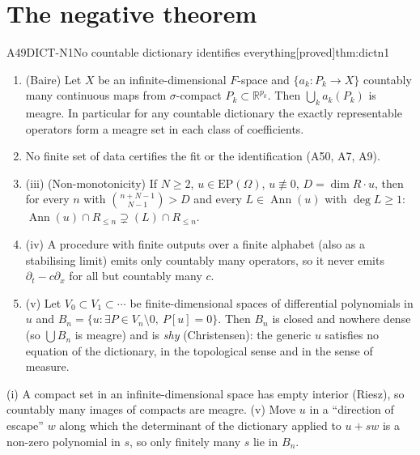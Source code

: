 \documentclass[11pt,a4paper,oneside]{report}
\newcommand{\badge}[2]{\textcolor{#1}{\textsf{\footnotesize[#2]}}}
\newcommand{\proved}{\badge{cC}{proved}}
\newcommand{\R}{\mathbb{R}}\newcommand{\C}{\mathbb{C}}\newcommand{\N}{\mathbb{N}}\newcommand{\Z}{\mathbb{Z}}\newcommand{\Q}{\mathbb{Q}}
\newcommand{\Ann}{\operatorname{Ann}}
\newcommand{\EP}{\mathrm{EP}}
\newenvironment{dimcard}[5]{\par\Needspace{12\baselineskip}\begin{dimcardbox}{#1}{#2}{#3}{#4}{#5}}{\end{dimcardbox}}
\begin{document}
\section{The negative theorem}

\begin{dimcard}{A49}{DICT-N1}{No countable dictionary identifies everything}{\proved}{thm:dictn1}
\begin{enumerate}[label=(\roman*)]
\item (Baire) Let $X$ be an infinite-dimensional $F$-space and $\{a_k:P_k\to X\}$ countably many continuous maps from $\sigma$-compact $P_k\subset\R^{p_k}$. Then $\bigcup_ka_k(P_k)$ is meagre. In particular for any countable dictionary the exactly representable operators form a meagre set in each class of coefficients.
\item No finite set of data certifies the fit or the identification (A50, A7, A9).
\item (iii) (Non-monotonicity) If $N\ge2$, $u\in\EP(\Omega)$, $u\not\equiv0$, $D=\dim R\cdot u$, then for every $n$ with $\binom{n+N-1}{N-1}>D$ and every $L\in\Ann(u)$ with $\deg L\ge1$: $\Ann(u)\cap R_{\le n}\supsetneq(L)\cap R_{\le n}$.
\item (iv) A procedure with finite outputs over a finite alphabet (also as a stabilising limit) emits only countably many operators, so it never emits $\partial_t-c\partial_x$ for all but countably many $c$.
\item (v) Let $V_0\subset V_1\subset\cdots$ be finite-dimensional spaces of differential polynomials in $u$ and $B_n=\{u:\exists P\in V_n\setminus0,\ P[u]=0\}$. Then $B_n$ is closed and nowhere dense (so $\bigcup B_n$ is meagre) and is \emph{shy} (Christensen): the generic $u$ satisfies no equation of the dictionary, in the topological sense and in the sense of measure.
\end{enumerate}
\end{dimcard}

\begin{proofidea}
(i) A compact set in an infinite-dimensional space has empty interior (Riesz), so countably many images of compacts are meagre. (v) Move $u$ in a ``direction of escape'' $w$ along which the determinant of the dictionary applied to $u+sw$ is a non-zero polynomial in $s$, so only finitely many $s$ lie in $B_n$.
\end{proofidea}
\end{document}
